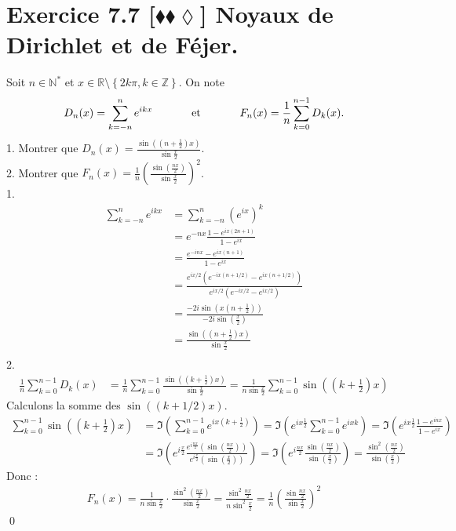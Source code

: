 \documentclass[10pt]{article}
\begin{document}
\section*{Exercice 7.7 [$\blacklozenge\blacklozenge\lozenge$] Noyaux de Dirichlet et de Féjer.}
\begin{tcolorbox}[enhanced, width=7in, center, size=fbox, fontupper=\large, drop shadow southwest]
    Soit $n\in\mathbb{N}^*$ et $x\in\mathbb{R} \setminus \left\{ 2k\pi, k\in\mathbb{Z} \right\}$. On note
    \begin{equation*}
        D_n(x) = \sum_{k=-n}^{n}{e^{ikx}} \hspace{1.25cm} \text{et} \hspace{1.25cm} F_n(x) = \frac{1}{n}\sum_{k=0}^{n-1}{D_k(x)}.
    \end{equation*}
    1. Montrer que $D_n(x)=\frac{\sin\left( (n+\frac{1}{2})x \right)}{\sin\frac{x}{2}}$.\\
    2. Montrer que $F_n(x)=\frac{1}{n}\left( \frac{\sin\left( \frac{nx}{2} \right)}{\sin\frac{x}{2}} \right)^2$.\\
    1. 
    \begin{align*}
        \sum_{k=-n}^{n}{e^{ikx}}&=\sum_{k=-n}^{n}{\left(e^{ix}\right)^k}\\
        &=e^{-nx}\frac{1-e^{ix(2n+1)}}{1-e^{ix}}\\
        &=\frac{e^{-inx}-e^{ix(n+1)}}{1-e^{ix}}\\
        &=\frac{e^{ix/2}(e^{-ix(n+1/2)}-e^{ix(n+1/2)})}{e^{ix/2}(e^{-ix/2}-e^{ix/2})}\\
        &=\frac{-2i\sin(x(n+\frac{1}{2}))}{-2i\sin(\frac{x}{2})}\\
        &=\frac{\sin((n+\frac{1}{2})x)}{\sin\frac{x}{2}}\\
    \end{align*}
    2.
    \begin{align*}
        \frac{1}{n}\sum_{k=0}^{n-1}{D_k(x)} &= \frac{1}{n}\sum_{k=0}^{n-1}{\frac{\sin((k+\frac{1}{2})x)}{\sin\frac{x}{2}}}=\frac{1}{n\sin\frac{x}{2}}\sum_{k=0}^{n-1}{\sin((k+\frac{1}{2})x)}
    \end{align*}
    Calculons la somme des $\sin((k+1/2)x)$.
    \begin{align*}
        \sum^{n-1}_{k=0}{\sin((k+\frac{1}{2})x)}&=\Im\left( \sum_{k=0}^{n-1}{e^{ix(k+\frac{1}{2})}} \right) = \Im\left( e^{ix\frac{1}{2}}\sum_{k=0}^{n-1}{e^{ixk}} \right) = \Im\left( e^{ix\frac{1}{2}}\frac{1-e^{inx}}{1-e^{ix}} \right)\\
        &= \Im\left( e^{i\frac{x}{2}}\frac{e^{i\frac{nx}{2}}(\sin(\frac{nx}{2}))}{e^{i\frac{x}{2}}(\sin(\frac{x}{2}))} \right) = \Im\left(e^{i\frac{nx}{2}}\frac{\sin(\frac{nx}{2})}{\sin(\frac{x}{2})}\right)=\frac{\sin^2(\frac{nx}{2})}{\sin(\frac{x}{2})}
    \end{align*}
    Donc :
    \begin{align*}
        F_n(x)=\frac{1}{n\sin\frac{x}{2}}\cdot\frac{\sin^2(\frac{nx}{2})}{\sin\frac{x}{2}}=\frac{\sin^2\frac{nx}{2}}{n\sin^2\frac{x}{2}}=\frac{1}{n}\left(\frac{\sin\frac{nx}{2}}{\sin\frac{x}{2}}\right)^2
    \end{align*}
    \qed
\end{tcolorbox}
\end{document}
